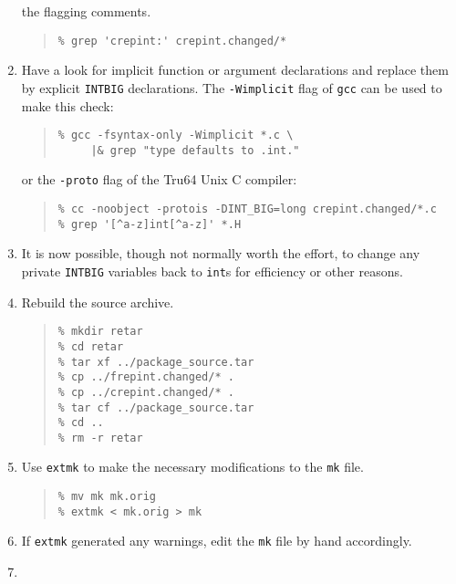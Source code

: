 \documentclass[twoside,11pt]{article}
\newcommand{\htmlref}[2]{#1}
\newcommand{\html}[1]{}
\renewcommand{\_}{\texttt{\symbol{95}}}
\newcommand{\xroutine}[1]{\htmlref{{\tt #1}}{#1}}
\newcommand{\file}[1]{{\tt #1}}
\newcommand{\routine}[1]{{\tt #1}}
\newcommand{\cc}[1]{{\tt #1}}
\newenvironment{squote}{\begin{quote}\begin{small}}{\end{small}\end{quote}}
\begin{document}
\begin{enumerate}
the flagging comments.
\begin{squote}
\begin{verbatim}
% grep 'crepint:' crepint.changed/*
\end{verbatim}
\end{squote}
%
\item
Have a look for implicit function or argument declarations
and replace them by explicit \cc{INT\_BIG} declarations.
The {\tt -Wimplicit} flag of \file{gcc} can be used to make this check:
\begin{squote}
\begin{verbatim}
% gcc -fsyntax-only -Wimplicit *.c \
     |& grep "type defaults to .int."
\end{verbatim}
\end{squote}
or the {\tt -proto} flag of the Tru64 Unix C compiler:
\begin{squote}
\begin{verbatim}
% cc -noobject -protois -DINT_BIG=long crepint.changed/*.c
% grep '[^a-z]int[^a-z]' *.H
\end{verbatim}
\end{squote}
%
\item
It is now possible, though not normally worth the effort, 
to change any private \cc{INT\_BIG} variables back to \cc{int}s
for efficiency or other reasons.
\html{\begin{squote}\end{squote}}
%
\item
Rebuild the source archive.
\begin{squote}
\begin{verbatim}
% mkdir retar
% cd retar
% tar xf ../package_source.tar
% cp ../frepint.changed/* .
% cp ../crepint.changed/* .
% tar cf ../package_source.tar
% cd ..
% rm -r retar
\end{verbatim}
\end{squote}
%
\item
Use \xroutine{extmk} to make the necessary modifications to the \file{mk} file.
\begin{squote}
\begin{verbatim}
% mv mk mk.orig
% extmk < mk.orig > mk
\end{verbatim}
\end{squote}
%
\item
If \routine{extmk} generated any warnings, edit the \file{mk} file by
hand accordingly.
\html{\begin{squote}\end{squote}}
%
\item

\end{enumerate}
\end{document}
